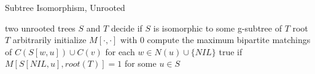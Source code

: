 \documentclass{beamer}
\begin{document}
\begin{frame}{Subtree Isomorphism, Unrooted}
\begin{algorithm}[H] 
	\caption{Unooted Subtree Isomorphism} 
	\begin{algorithmic}[1] 
		\Require two unrooted trees $S$ and $T$
		\Ensure decide if $S$ is isomorphic to some g-subtree of $T$
		\State root $T$ arbitrarily
		\State initialize $M[\cdot, \cdot]$ with 0
		\State compute the maximum bipartite matchings of $C(S[w, u]) \cup C(v)$ for each $w \in N(u) \cup \{NIL\}$
		\EndFor
		\EndFor
		\State \Return true if $M[S[NIL, u], root(T)] = 1$ for some $u \in S$
	\end{algorithmic} 
\end{algorithm}
\end{frame}
\end{document}
